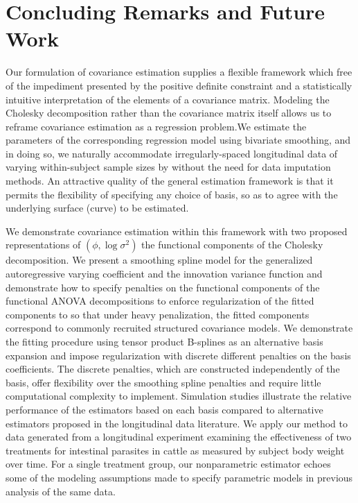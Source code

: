 
\chapter{Concluding Remarks and Future Work}\label{concluding-remarks-chapter}




Our formulation of covariance estimation supplies a flexible framework which free of the impediment presented by the positive definite constraint and a statistically intuitive interpretation of the elements of a covariance matrix. Modeling the Cholesky decomposition rather than the covariance matrix itself allows us to reframe covariance estimation as a regression problem.We estimate the parameters of the corresponding regression model using bivariate smoothing, and in doing so, we naturally accommodate irregularly-spaced longitudinal data of varying within-subject sample sizes by without the need for data imputation methods. An attractive quality of the general estimation framework is that it permits the flexibility of specifying any choice of basis, so as to agree with the underlying surface (curve) to be estimated. 

\bigskip
We demonstrate covariance estimation within this framework with two proposed representations of $\left(\phi, \log\sigma^2\right)$ the functional components of the Cholesky decomposition. We present a smoothing spline model for the generalized autoregressive varying coefficient and the innovation variance function and demonstrate how to specify penalties on the functional components of the functional ANOVA decompositions to enforce regularization of the fitted components to so that under heavy penalization, the fitted components correspond to commonly recruited structured covariance models. We demonstrate the fitting procedure using tensor product B-splines as an alternative basis expansion and impose regularization with discrete different penalties on the basis coefficients. The discrete penalties, which are constructed independently of the basis, offer flexibility over the smoothing spline penalties and require little computational complexity to implement. Simulation studies illustrate the relative performance of the estimators based on each basis compared to alternative estimators proposed in the longitudinal data literature. We apply our method to data generated from a longitudinal experiment examining the effectiveness of two treatments for intestinal parasites in cattle as measured by subject body weight over time. For a single treatment group, our nonparametric estimator echoes some of the modeling assumptions made to specify parametric models in previous analysis of the same data.

